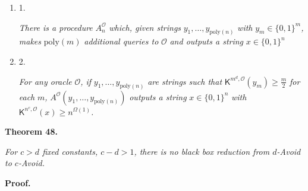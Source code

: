 \documentclass[10pt,a4paper]{article}
\begin{document}
\begin{enumerate}


\item[] 
1. 


\emph{There is a procedure }$A^{\mathcal{O}}_{n}$\emph{ which, given strings }$y_{1},\ldots,y_{\mathrm{poly}(n)}$\emph{ with }$y_{m}\in\{0,1\}^{m}$\emph{, makes }$\mathrm{poly}(m)$\emph{ additional queries to }$\mathcal{O}$\emph{ and outputs a string }$x\in\{0,1\}^{n}$\emph{}\par





\item[] 
2. 


\emph{For any oracle }$\mathcal{O}$\emph{, if }$y_{1},\ldots,y_{\mathrm{poly}(n)}$\emph{ are strings such that }${\mathsf{K}}^{m^{d},\mathcal{O}}(y_{m})\geq\frac{m}{2}$\emph{ for each }$m$\emph{, }$A^{\mathcal{O}}(y_{1},\ldots,y_{\mathrm{poly}(n)})$\emph{ outputs a string }$x\in\{0,1\}^{n}$\emph{ with }${\mathsf{K}}^{n^{c},\mathcal{O}}(x)\geq n^{\Omega(1)}$\emph{.}\par





\end{enumerate}







\par\medskip\noindent\textbf{
\textbf{Theorem 48}\textbf{.}
}\par



\emph{For $c>d$ fixed constants, $c-d>1$, there is no black box reduction from $d$-Avoid to $c$-Avoid.}\par






\par\medskip\noindent\textbf{Proof.}\par
\end{document}
